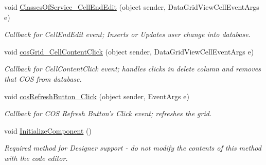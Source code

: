 \begin{DoxyCompactItemize}
void \hyperlink{class_ias_pbx_config_1_1_classes_of_service_a8353a8ba4d45caf1c2feebb4ca79b07e}{ClassesOfService\_\-CellEndEdit} (object sender, DataGridViewCellEventArgs e)
\begin{DoxyCompactList}\small\item\em Callback for CellEndEdit event; Inserts or Updates user change into database. \item\end{DoxyCompactList}\item 
void \hyperlink{class_ias_pbx_config_1_1_classes_of_service_ad3ff80cdde49deb255892d69bb637e0e}{cosGrid\_\-CellContentClick} (object sender, DataGridViewCellEventArgs e)
\begin{DoxyCompactList}\small\item\em Callback for CellContentClick event; handles clicks in delete column and removes that COS from database. \item\end{DoxyCompactList}\item 
void \hyperlink{class_ias_pbx_config_1_1_classes_of_service_a5486a88fb21ad0789ddf5f1388a9b716}{cosRefreshButton\_\-Click} (object sender, EventArgs e)
\begin{DoxyCompactList}\small\item\em Callback for COS Refresh Button's Click event; refreshes the grid. \item\end{DoxyCompactList}\item 
void \hyperlink{class_ias_pbx_config_1_1_classes_of_service_a384f92ca416d7a9cd4b17675d06c7b07}{InitializeComponent} ()
\begin{DoxyCompactList}\small\item\em Required method for Designer support -\/ do not modify the contents of this method with the code editor. \item\end{DoxyCompactList}\end{DoxyCompactItemize}
